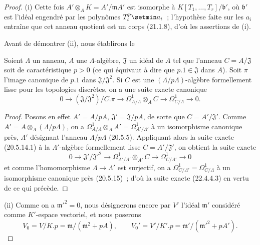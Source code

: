 \begin{proof}
(i) Cette fois $A'\otimes_AK=A'/\mathfrak mA'$ est isomorphe à
$K[T_1,\ldots,T_r]/\mathfrak b'$, où $\mathfrak b'$ est l'idéal engendré
par les polynômes $T_i^p\setmin a_i$~; l'hypothèse faite sur les $a_i$ entraîne que
cet anneau quotient est un corps (21.1.8), d'où les assertions de (i).

Avant de démontrer (ii), nous établirons le

\begin{lemma}[22.4.4.2]
\label{0.22.4.4.2-fr}
Soient $\Lambda$ un anneau, $A$ une $\Lambda$-algèbre, $\mathfrak J$ un
idéal de $A$ tel que l'anneau $C=A/\mathfrak J$ soit de caractéristique
$p>0$ (ce qui équivaut à dire que $p.1\in\mathfrak J$ dans $A$). Soit
$\pi$ l'image canonique de $p.1$ dans
$\mathfrak J/\mathfrak J^2$. Si $C$ est une $(\Lambda/p\Lambda)$-algèbre
formellement lisse pour les topologies discrètes, on a une suite exacte
canonique
\begin{equation}
\label{0.22.4.4.3-fr}
  0\longrightarrow(\mathfrak J/\mathfrak J^2)/C.\pi
  \longrightarrow\Omega^1_{A/\Lambda}\otimes_AC
  \longrightarrow\Omega^1_{C/\Lambda}\longrightarrow0.
  \tag{22.4.4.3}
\end{equation}
\end{lemma}

\begin{proof}
Posons en effet $A'=A/pA$, $\mathfrak J'=\mathfrak J/pA$, de sorte que
$C=A'/\mathfrak J'$. Comme
$A'=A\otimes_\Lambda(\Lambda/p\Lambda)$, on a
$\Omega^1_{A/\Lambda}\otimes_AA'=\Omega^1_{A'/\Lambda'}$ à un
isomorphisme canonique près, $\Lambda'$ désignant l'anneau
$\Lambda/p\Lambda$ (20.5.5). Appliquant alors la suite exacte (20.5.14.1) à
la $\Lambda'$-algèbre formellement lisse $C=A'/\mathfrak J'$, on obtient la
suite exacte
\[
  0\longrightarrow\mathfrak J'/\mathfrak J'^2
  \longrightarrow\Omega^1_{A'/\Lambda'}\otimes_{A'}C
  \longrightarrow\Omega^1_{C/\Lambda'}\longrightarrow0
\]
et comme l'homomorphisme $\Lambda\to\Lambda'$ est surjectif, on a
$\Omega^1_{C/\Lambda'}=\Omega^1_{C/\Lambda}$ à un isomorphisme canonique
près (20.5.15)~; d'où la suite exacte (22.4.4.3) en vertu de ce qui précède.
\end{proof}

(ii) Comme on a $\mathfrak m'^2=0$, nous désignerons encore par $V'$ l'idéal
$\mathfrak m'$ considéré comme $K'$-espace vectoriel, et nous poserons
\begin{equation}
\label{0.22.4.4.4-fr}
  V_0=V/K.p=\mathfrak m/(\mathfrak m^2+pA),\qquad
  V_0'=V'/K'.p=\mathfrak m'/(\mathfrak m'^2+pA').
  \tag{22.4.4.4}
\end{equation}


\end{proof}
